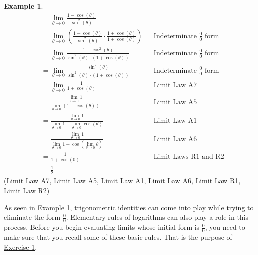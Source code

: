 \documentclass[10pt,oneside,]{book}
\theoremstyle{plain}
\theoremstyle{definition}
\newtheorem{example}[theorem]{Example}
\numberwithin{equation}{section}
\newcommand{\fe}[2]{#1\mathopen{}\left(#2\right)\mathclose{}}
\begin{document}
\begin{example}\label{example-second-indeterminate}
\begin{align*}
&\phantom{{}={}}\lim_{\theta\to0}\frac{1-\fe{\cos}{\theta}}{\fe{\sin^2}{\theta}}\\
&=\lim_{\theta\to0}\left(\frac{1-\fe{\cos}{\theta}}{\fe{\sin^2}{\theta}}\cdot\frac{1+\fe{\cos}{\theta}}{1+\fe{\cos}{\theta}}\right)&&\text{Indeterminate $\frac{0}{0}$ form}\\
&=\lim_{\theta\to0}\frac{1-\fe{\cos^2}{\theta}}{\fe{\sin^2}{\theta}\cdot\left(1+\fe{\cos}{\theta}\right)}&&\text{Indeterminate $\frac{0}{0}$ form}\\
&=\lim_{\theta\to0}\frac{\fe{\sin^2}{\theta}}{\fe{\sin^2}{\theta}\cdot\left(1+\fe{\cos}{\theta}\right)}&&\text{Indeterminate $\frac{0}{0}$ form}\\
&=\lim_{\theta\to0}\frac{1}{1+\fe{\cos}{\theta}}&&\text{Limit Law A7}\\
&=\frac{\lim_{\theta\to0}1}{\lim_{\theta\to0}\left(1+\fe{\cos}{\theta}\right)}&&\text{Limit Law A5}\\
&=\frac{\lim_{\theta\to0}1}{\lim_{\theta\to0}1+\lim_{\theta\to0}\fe{\cos}{\theta}}&&\text{Limit Law A1}\\
&=\frac{\lim_{\theta\to0}1}{\lim_{\theta\to0}1+\fe{\cos}{\lim_{\theta\to0}\theta}}&&\text{Limit Law A6}\\
&=\frac{1}{1+\fe{\cos}{0}}&&\text{Limit Laws R1 and R2}\\
&=\frac{1}{2}
\end{align*}(\hyperref[lla7]{Limit Law A7}, \hyperref[lla5]{Limit Law A5}, \hyperref[lla1]{Limit Law A1}, \hyperref[lla6]{Limit Law A6}, \hyperref[llr1]{Limit Law R1}, \hyperref[llr2]{Limit Law R2})%
\end{example}
\par
As seen in \hyperref[example-second-indeterminate]{Example \ref{example-second-indeterminate}}, trigonometric identities can come into play while trying to eliminate the form \(\frac{0}{0}\). Elementary rules of logarithms can also play a role in this process. Before you begin evaluating limits whose initial form is \(\frac{0}{0}\), you need to make sure that you recall some of these basic rules. That is the purpose of \hyperlink{exercise-identities-review}{Exercise 1}.%
\typeout{************************************************}
\typeout{************************************************}
\end{document}
